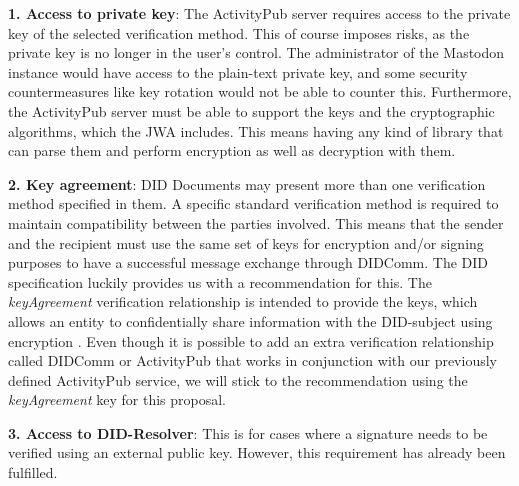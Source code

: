\textbf{1. Access to private key}: The ActivityPub server requires access to the private key of the selected verification method. This of course imposes risks, as the private key is no longer in the user's control. The administrator of the Mastodon instance would have access to the plain-text private key, and some security countermeasures like key rotation would not be able to counter this. Furthermore, the ActivityPub server must be able to support the keys and the cryptographic algorithms, which the JWA includes. This means having any kind of library that can parse them and perform encryption as well as decryption with them.

\textbf{2. Key agreement}: DID Documents may present more than one verification method specified in them. A specific standard verification method is required to maintain compatibility between the parties involved. This means that the sender and the recipient must use the same set of keys for encryption and/or signing purposes to have a successful message exchange through DIDComm. The DID specification luckily provides us with a recommendation for this. The \emph{keyAgreement} verification relationship is intended to provide the keys, which allows an entity to confidentially share information with the DID-subject using encryption \cite{sporny_longley_sabadello_reed_steele_2021}. Even though it is possible to add an extra verification relationship called DIDComm or ActivityPub that works in conjunction with our previously defined ActivityPub service, we will stick to the recommendation using the \emph{keyAgreement} key for this proposal.

\textbf{3. Access to DID-Resolver}: This is for cases where a signature needs to be verified using an external public key. However, this requirement has already been fulfilled. 

